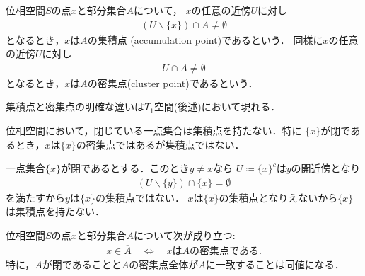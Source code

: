	\begin{screen}
		\begin{dfn}
			位相空間$S$の点$x$と部分集合$A$について，
			$x$の任意の近傍$U$に対し
			\begin{align}
				(U \backslash \{x\}) \cap A \neq \emptyset
			\end{align}
			となるとき，$x$は$A$の集積点
			(accumulation point)であるという．
			同様に$x$の任意の近傍$U$に対し
			\begin{align}
				U \cap A \neq \emptyset
			\end{align}
			となるとき，$x$は$A$の密集点(cluster point)であるという．
		\end{dfn}
	\end{screen}
	
	集積点と密集点の明確な違いは$T_1$空間(後述)において現れる．
	\begin{screen}
		\begin{thm}[閉である一点集合は集積点を持たない]
		\label{thm:closed_singleton_has_no_accumulation_point}
			位相空間において，閉じている一点集合は集積点を持たない．特に
			$\{x\}$が閉であるとき，$x$は$\{x\}$の密集点ではあるが集積点ではない．
		\end{thm}
	\end{screen}
	
	\begin{prf}
		一点集合$\{x\}$が閉であるとする．このとき$y \neq x$なら
		$U \coloneqq \{x\}^c$は$y$の開近傍となり
		\begin{align}
			(U \backslash \{y\}) \cap \{x\} = \emptyset
		\end{align}
		を満たすから$y$は$\{x\}$の集積点ではない．
		$x$は$\{x\}$の集積点となりえないから$\{x\}$は集積点を持たない．
		\QED
	\end{prf}
	
	\begin{screen}
		\begin{thm}[閉集合は密集点集合]
		\label{thm:belongs_to_closure_iff_clusters}
			位相空間$S$の点$x$と部分集合$A$について次が成り立つ:
			\begin{align}
				x \in \overline{A} \quad \Longleftrightarrow \quad
				\mbox{$x$は$A$の密集点である}.
				\label{eq:thm_belongs_to_closure_iff_clusters}
			\end{align}
			特に，$A$が閉であることと$A$の密集点全体が$A$に一致することは同値になる．
		\end{thm}
	\end{screen}
	
